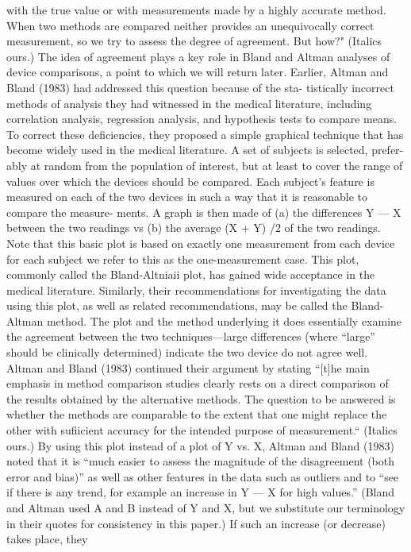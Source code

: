 with the true value or with measurements made by a highly accurate method. When
two methods are compared neither provides an unequivocally correct measurement,
so we try to assess the degree of agreement. But how?" (Italics ours.) The idea of
agreement plays a key role in Bland and Altman analyses of device comparisons, a
point to which we will return later.
Earlier, Altman and Bland (1983) had addressed this question because of the sta-
tistically incorrect methods of analysis they had witnessed in the medical literature,
including correlation analysis, regression analysis, and hypothesis tests to compare
means. To correct these deﬁciencies, they proposed a simple graphical technique that
has become widely used in the medical literature. A set of subjects is selected, prefer-
ably at random from the population of interest, but at least to cover the range of
values over which the devices should be compared. Each subject’s feature is measured
on each of the two devices in such a way that it is reasonable to compare the measure-
ments. A graph is then made of (a) the differences Y — X between the two readings
vs (b) the average (X + Y) /2 of the two readings. Note that this basic plot is based
on exactly one measurement from each device for each subject we refer to this as
the one-measurement case. This plot, commonly called the Bland-Altniaii plot, has
gained wide acceptance in the medical literature. Similarly, their recommendations
for investigating the data using this plot, as well as related recommendations, may
be called the Bland-Altman method.
The plot and the method underlying it does essentially examine the agreement
between the two techniques—large differences (where “large” should be clinically
determined) indicate the two device do not agree well. Altman and Bland (1983)
continued their argument by stating “[t]he main emphasis in method comparison
studies clearly rests on a direct comparison of the results obtained by the alternative
methods. The question to be answered is whether the methods are comparable to
the extent that one might replace the other with suﬁicient accuracy for the intended
purpose of measurement.“ (Italics ours.)
By using this plot instead of a plot of Y vs. X, Altman and Bland (1983) noted
that it is “much easier to assess the magnitude of the disagreement (both error and
bias)” as well as other features in the data such as outliers and to “see if there is
any trend, for example an increase in Y — X for high values.” (Bland and Altman
used A and B instead of Y and X, but we substitute our terminology in their quotes
for consistency in this paper.) If such an increase (or decrease) takes place, they
